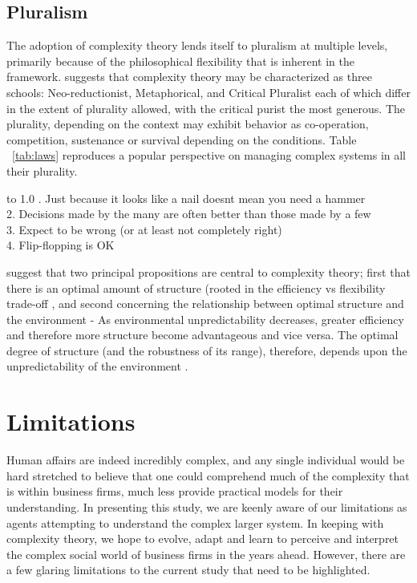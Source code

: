 \documentclass[12pt,letterpaper]{article}
\begin{document}
\subsection{Pluralism}
The adoption of complexity theory lends itself to pluralism at multiple levels, primarily because of the philosophical flexibility that is inherent in the framework.
\cite{Richardson2011} suggests that complexity theory may be characterized as three schools: Neo-reductionist, Metaphorical, and Critical Pluralist each of which differ in the extent of plurality allowed, with the critical purist the most generous. The plurality, depending on the context may exhibit behavior as co-operation, competition, sustenance or survival depending on the conditions. Table ~\ref{tab:laws} reproduces a popular perspective on managing complex systems in all their plurality.

\begin{table}[h!]
\begin{tabu} to 1.0\textwidth { |X[l]|} 
. Just because it looks like a nail doesn\textquotesingle t mean you need a hammer\\
2. Decisions made by the many are often better than those made by a few\\
3. Expect to be wrong (or at least not completely right)\\
4. Flip-flopping is OK\\
\hline 
\end{tabu}
\caption{The laws of complex organizational management, Adopted from \cite{Richardson2011}}
\label{tab:laws}
\end{table}

\cite{Eisenhardt2011} suggest that two principal propositions are central to complexity theory; first that there is an optimal amount of structure (rooted in the efficiency vs flexibility trade-off \citep{Davis2009}, and second concerning the relationship between optimal structure and the environment - As environmental unpredictability decreases, greater efficiency and therefore more structure become advantageous and vice versa. The optimal degree of structure (and the robustness of its range), therefore, depends upon the unpredictability of the environment \citep{Eisenhardt2001}.

\section{Limitations}\label{S:Limitations}
Human affairs are indeed incredibly complex, and any single individual would be hard stretched to believe that one could comprehend much of the complexity that is within business firms, much less provide practical models for their understanding. In presenting this study, we are keenly aware of our limitations as  agents attempting to understand the complex larger system. In keeping with complexity theory,  we hope to evolve, adapt and learn to perceive and interpret the complex social world of business firms in the years ahead. However, there are a few glaring limitations to the current study that need to be highlighted. 
\end{document}
